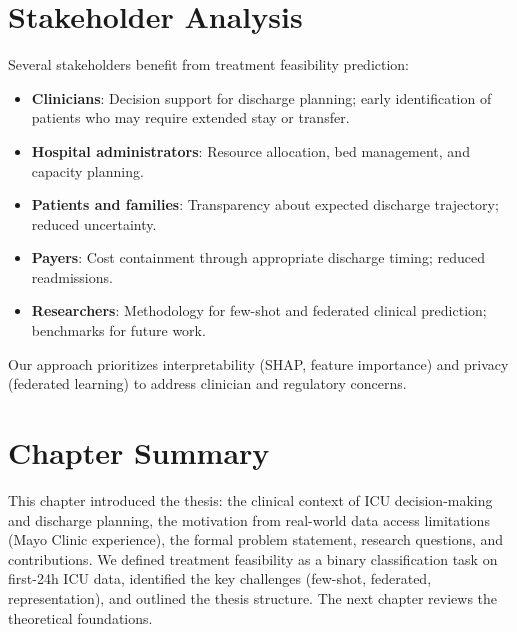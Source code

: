 \section{Stakeholder Analysis}

Several stakeholders benefit from treatment feasibility prediction:

\begin{itemize}
\item \textbf{Clinicians}: Decision support for discharge planning; early identification of patients who may require extended stay or transfer.
\item \textbf{Hospital administrators}: Resource allocation, bed management, and capacity planning.
\item \textbf{Patients and families}: Transparency about expected discharge trajectory; reduced uncertainty.
\item \textbf{Payers}: Cost containment through appropriate discharge timing; reduced readmissions.
\item \textbf{Researchers}: Methodology for few-shot and federated clinical prediction; benchmarks for future work.
\end{itemize}

Our approach prioritizes interpretability (SHAP, feature importance) and privacy (federated learning) to address clinician and regulatory concerns.

\section{Chapter Summary}

This chapter introduced the thesis: the clinical context of ICU decision-making and discharge planning, the motivation from real-world data access limitations (Mayo Clinic experience), the formal problem statement, research questions, and contributions. We defined treatment feasibility as a binary classification task on first-24h ICU data, identified the key challenges (few-shot, federated, representation), and outlined the thesis structure. The next chapter reviews the theoretical foundations.

